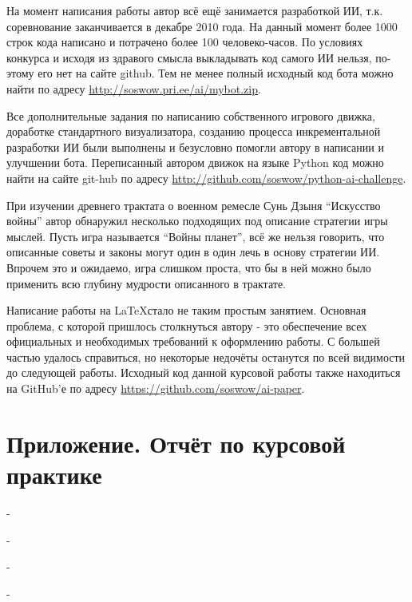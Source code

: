 \documentclass[12pt]{report}
\begin{document}
На момент написания работы автор всё ещё занимается разработкой ИИ, т.к. соревнование заканчивается в декабре 2010 года. На данный момент более 1000 строк кода написано и потрачено более 100 человеко-часов. По условиях конкурса и исходя из здравого смысла выкладывать код самого ИИ нельзя, по-этому его нет на сайте github. Тем не менее полный исходный код бота можно найти по адресу \url{http://soswow.pri.ee/ai/mybot.zip}.

Все дополнительные задания по написанию собственного игрового движка, доработке стандартного визуализатора, созданию процесса инкрементальной разработки ИИ были выполнены и безусловно помогли автору в написании и улучшении бота. Переписанный автором движок на языке Python код можно найти на сайте git-hub по адресу \url{http://github.com/soswow/python-ai-challenge}.

При изучении древнего трактата о военном ремесле Сунь Дзыня ``Искусство войны'' автор обнаружил несколько подходящих под описание стратегии игры мыслей. Пусть игра называется ``Войны планет'', всё же нельзя говорить, что описанные советы и законы могут один в один лечь в основу стратегии ИИ. Впрочем это и ожидаемо, игра слишком проста, что бы в ней можно было применить всю глубину мудрости описанного в трактате.

Написание работы на \LaTeX стало не таким простым занятием. Основная проблема, с которой пришлось столкнуться автору - это обеспечение всех официальных и необходимых требований к оформлению работы. С большей частью удалось справиться, но некоторые недочёты останутся по всей видимости до следующей работы. Исходный код данной курсовой работы также находиться на GitHub'е по адресу \url{https://github.com/soswow/ai-paper}.

\appendix
\chapter{Приложение. Отчёт по курсовой практике}
\pagebreak
-

\clearpage
\pagebreak
-

\clearpage
\pagebreak
-

\clearpage
\pagebreak
-
\clearpage


\clearpage




\end{document}
